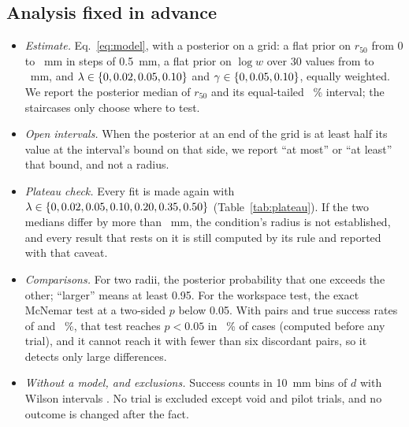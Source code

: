 \subsection{Analysis fixed in advance}
\begin{itemize}
\item \emph{Estimate.} Eq.~\eqref{eq:model}, with a posterior on a grid: a flat prior on $r_{50}$ from 0 to \gridRadiusMax~mm in steps of 0.5~mm, a flat prior on $\log w$ over 30 values from \gridWidthMin to \gridWidthMax~mm, and $\lambda\in\{0, 0.02, 0.05, 0.10\}$ and $\gamma\in\{0, 0.05, 0.10\}$, equally weighted. We report the posterior median of $r_{50}$ and its equal-tailed \intervalLevel~\% interval; the staircases only choose where to test. %
\item \emph{Open intervals.} When the posterior at an end of the grid is at least half its value at the interval's bound on that side, we report ``at most'' or ``at least'' that bound, and not a radius.
\item \emph{Plateau check.} Every fit is made again with $\lambda\in\{0, 0.02, 0.05, 0.10, 0.20, 0.35, 0.50\}$ (Table~\ref{tab:plateau}). If the two medians differ by more than \plateauShiftLimit~mm, the condition's radius is not established, and every result that rests on it is still computed by its rule and reported with that caveat.
\item \emph{Comparisons.} For two radii, the posterior probability that one exceeds the other; ``larger'' means at least 0.95. For the workspace test, the exact McNemar test at a two-sided $p$ below 0.05. With \nPairsPlanned pairs and true success rates of \simPairedRateLow and \simPairedRateHigh~\%, that test reaches $p<0.05$ in \simPairedPower~\% of cases (computed before any trial), and it cannot reach it with fewer than six discordant pairs, so it detects only large differences. %
\item \emph{Without a model, and exclusions.} Success counts in 10~mm bins of $d$ with Wilson intervals \cite{wilson1927probable}. No trial is excluded except void and pilot trials, and no outcome is changed after the fact. %
\end{itemize}

